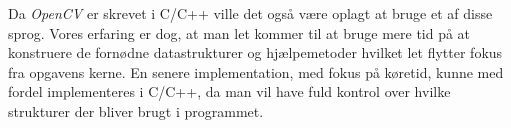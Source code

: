 {Da \emph{OpenCV} er skrevet i C/C++ ville det også være oplagt at bruge et af
disse sprog. Vores erfaring er dog, at man let kommer til at bruge mere
tid på at konstruere de fornødne datastrukturer og hjælpemetoder hvilket
let flytter fokus fra opgavens kerne. En senere implementation, med
fokus på køretid, kunne med fordel implementeres i C/C++, da man vil
have fuld kontrol over hvilke strukturer der bliver brugt i programmet.
}

